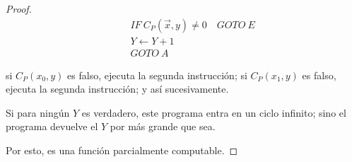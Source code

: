 \begin{proof} \phantom{.}

    \begin{align*}
        [A] \quad &IF ~ C_P(\overrightarrow{x},y) \neq 0 \quad GOTO ~ E\\
                    &Y \gets Y + 1 \\
                    &GOTO ~ A
    \end{align*} 

    si $C_P(x_0, y)$ es falso, ejecuta la segunda instrucción; 
    si $C_P(x_1, y)$ es falso, ejecuta la segunda instrucción;
    y así sucesivamente.

   Si para ningún $Y$ es verdadero, este programa entra en un ciclo infinito; 
   sino el programa devuelve el $Y$ por más grande que sea.

   Por esto, es una función parcialmente computable.
\end{proof}
